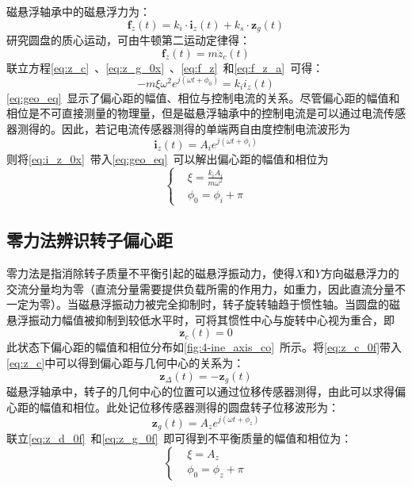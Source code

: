 \documentclass[
  lang=cn,
  degree=master,
  openany,oneside
]{nuaathesis}
\begin{document}
磁悬浮轴承中的磁悬浮力为：
\begin{equation}
	\label{eq:f_z}
	\boldsymbol{f}_z(t) = k_i \cdot \boldsymbol{i}_z(t) + k_s \cdot \boldsymbol{z}_g(t)
\end{equation}
研究圆盘的质心运动，可由牛顿第二运动定律得：
\begin{equation}
	\label{eq:f_z_a}
	\boldsymbol{f}_z(t) = m{\ddot{z}}_c(t)
\end{equation}
联立方程\autoref{eq:z_c}~、\autoref{eq:z_g_0x}~、\autoref{eq:f_z}~和\autoref{eq:f_z_a}~可得：
\begin{equation}
	\label{eq:geo_eq}
	-m \xi {\omega}^2e^{j(\omega t + \phi _0)} = k_ii_z(t)
\end{equation}
\autoref{eq:geo_eq}~显示了偏心距的幅值、相位与控制电流的关系。尽管偏心距的幅值和相位是不可直接测量的物理量，但是磁悬浮轴承中的控制电流是可以通过电流传感器测得的。因此，若记电流传感器测得的单端两自由度控制电流波形为
\begin{equation}
	\label{eq:i_z_0x}
	\boldsymbol{i}_z(t) = A_ie^{j(\omega t + \phi _i)}
\end{equation}
则将\autoref{eq:i_z_0x}~带入\autoref{eq:geo_eq}~可以解出偏心距的幅值和相位为
\begin{equation}
\left\{
\begin{aligned}
& \xi = \frac{k_iA_i}{m{\omega}^2}\\
& \phi _0 = \phi _i + \pi
\end{aligned}
\right.
\end{equation}


\subsection{零力法辨识转子偏心距}

零力法是指消除转子质量不平衡引起的磁悬浮振动力，使得$X$和$Y$方向磁悬浮力的交流分量均为零（直流分量需要提供负载所需的作用力，如重力，因此直流分量不一定为零）。当磁悬浮振动力被完全抑制时，转子旋转轴趋于惯性轴。当圆盘的磁悬浮振动力幅值被抑制到较低水平时，可将其惯性中心与旋转中心视为重合，即
\begin{equation}
	\label{eq:z_c_0f}
	\boldsymbol{z}_c(t) = 0
\end{equation}
此状态下偏心距的幅值和相位分布如\autoref{fig:4-ine_axis_co}~所示。将\autoref{eq:z_c_0f}带入\autoref{eq:z_c}中可以得到偏心距与几何中心的关系为：
\begin{equation}
	\label{eq:z_d_0f}
	\boldsymbol{z}_{\Delta}(t) = -\boldsymbol{z}_g(t)
\end{equation}
磁悬浮轴承中，转子的几何中心的位置可以通过位移传感器测得，由此可以求得偏心距的幅值和相位。此处记位移传感器测得的圆盘转子位移波形为：
\begin{equation}
	\label{eq:z_g_0f}
	\boldsymbol{z}_g(t) = A_ze^{j(\omega t + \phi _z)}
\end{equation}
联立\autoref{eq:z_d_0f}~和\autoref{eq:z_g_0f}~即可得到不平衡质量的幅值和相位为：
\begin{equation}
\left\{
\begin{aligned}
& \xi = A_z\\
& \phi _0 = \phi _z + \pi
\end{aligned}
\right.
\end{equation}
\end{document}
